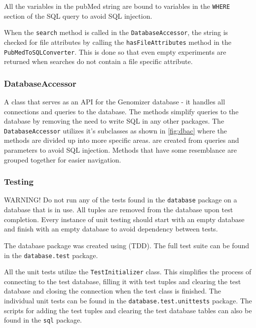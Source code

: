 All the variables in the pubMed string are bound to variables in the \texttt{WHERE} section of the SQL query to avoid SQL injection. 

When the \texttt{search} method is called in the \texttt{DatabaseAccessor}, the  string is checked for file attributes by calling the \texttt{hasFileAttributes} method in the \texttt{PubMedToSQLConverter}. This is done so that even empty experiments are returned when searches do not contain a file specific attribute.

\subsubsection{DatabaseAccessor}
A class that serves as an API for the Genomizer database - it handles all connections and queries to the database. The methods simplify queries to the database by removing the need to write SQL in any other packages. The \texttt{DatabaseAccessor} utilizes it's subclasses as shown in \ref{fig:dbac} where the methods are divided up into more specific areas.  are created from queries and parameters to avoid SQL injection. Methods that have some resemblance are grouped together for easier navigation.

\subsubsection{Testing}
WARNING! Do not run any of the tests found in the \texttt{database} package on a database that is in use. All tuples are removed from the database upon test completion. Every instance of unit testing should start with an empty database and finish with an empty database to avoid dependency between tests.

The database package was created using  (TDD). The full test suite can be found in the \texttt{database.test} package.

All the unit tests utilize the \texttt{TestInitializer} class. This simplifies the process of connecting to the test database, filling it with test tuples and clearing the test database and closing the connection when the test class is finished. 
The individual unit tests can be found in the \texttt{database.test.unittests} package. The scripts for adding the test tuples and clearing the test database tables can also be found in the \texttt{sql} package.